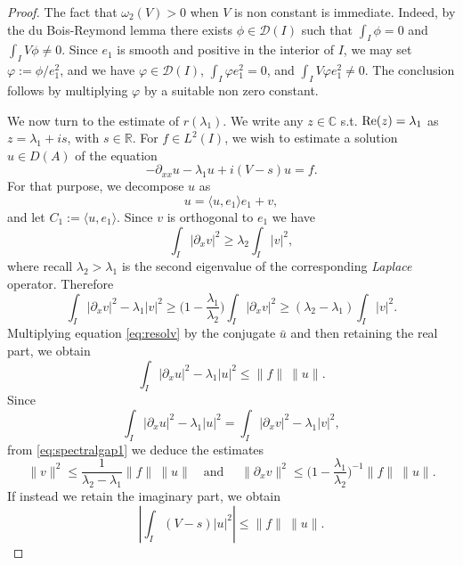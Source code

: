 \documentclass[12pt]{article}
\newcommand{\R}{\mathbb{R}}
\newcommand{\C}{\mathbb{C}}
\begin{document}
\begin{proof}
The fact that $\omega_2(V) > 0$ when $V$ is non constant is immediate.
Indeed, by the du Bois-Reymond lemma there exists 
$\phi \in \mathcal{D}(I)$ such that $\int_I \phi = 0$ and $\int_I
V \phi \neq 0.$ Since $e_1$ is smooth and positive in the interior of
$I$, we may set $\varphi := \phi / e_1^2$, and we have $\varphi \in
\mathcal{D}(I)$, $\int_I \varphi e_1^2 = 0$, and $\int_I
V \varphi e_1^2 \neq 0.$ The conclusion follows by multiplying
$\varphi$ by a suitable non zero constant. 

We now turn to the estimate of $r(\lambda_1).$ We write any 
$z \in \C$ s.t. ${\rm Re}(z) = \lambda_1$  as 
$z = \lambda_1 + is$, with $s \in \R.$ For $f \in L^2(I)$, 
we wish to estimate a solution $u \in D(A)$ of the equation 
\begin{equation}\label{eq:resolv}
-\partial_{xx}u - \lambda_1 u + i(V - s)u = f.
\end{equation}
For that purpose, we decompose $u$ as 
\begin{equation}\label{eq:decomp-u}
    u = \langle u, e_1\rangle e_1 + v,
\end{equation} and let $C_1 := \langle u, e_1 \rangle.$ Since $v$ is orthogonal to $e_1$ we have
\begin{equation}\label{eq:lambda2}
\int_I |\partial_x v|^2 \geq \lambda_2 \int_I |v|^2,
\end{equation}
where recall $\lambda_2>\lambda_1$ is the second eigenvalue of the corresponding 
\textit{Laplace} operator. Therefore
\begin{equation}\label{eq:spectralgap1}
\int_I |\partial_x v|^2 - \lambda_1 |v|^2 \geq \big(1 -
\frac{\lambda_1}{\lambda_2}\big)
\int_I |\partial_x v|^2 \geq (\lambda_2 - \lambda_1) \int_I
|v|^2.
\end{equation}
Multiplying equation \eqref{eq:resolv} by the conjugate $\bar u$ and then retaining the real
part, we obtain 
$$
\int_I |\partial_x u|^2 - \lambda_1 |u|^2 \leq \|f\|\: \|u\|. 
$$
Since 
$$
\int_I |\partial_x u|^2 - \lambda_1 |u|^2 = \int_I |\partial_x v|^2 - \lambda_1
|v|^2,
$$
from \eqref{eq:spectralgap1} we deduce the estimates
\begin{equation}\label{eq:controlv}
	\|v\|^2 \leq \frac{1}{\lambda_2 - \lambda_1}\|f\|\: \|u\|\quad \text{
	and } \quad
	\|\partial_x v\|^2 \leq \big(1 - \frac{\lambda_1}{\lambda_2}\big)^{-1}
\|f\|\: \|u\|.
\end{equation}
If instead we retain the imaginary part, we obtain
\begin{equation}\label{eq:controlweightedu}
\left| \int_I (V - s) |u|^2 \right| \leq \|f\|\: \|u\|.
\end{equation}


\end{proof}
\end{document}
